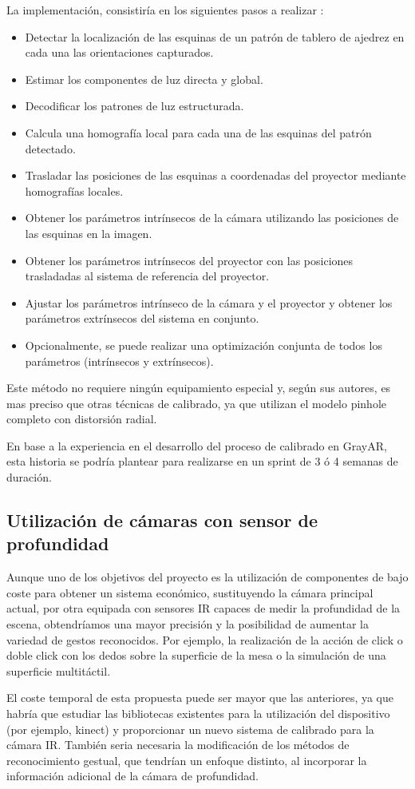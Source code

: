 La implementación, consistiría en los siguientes pasos a realizar \cite{Moreno}:
\begin{itemize}
\item Detectar la localización de las esquinas de un patrón de tablero de ajedrez en cada una las orientaciones capturados.
\item Estimar los componentes de luz directa y global.
\item Decodificar los patrones de luz estructurada.
\item Calcula una homografía local para cada una de las esquinas del patrón detectado.
\item Trasladar las posiciones de las esquinas a coordenadas del proyector mediante homografías locales.
\item Obtener los parámetros intrínsecos de la cámara utilizando las posiciones de las esquinas en la imagen.
\item Obtener los parámetros intrínsecos del proyector con las posiciones trasladadas al sistema de referencia del proyector.
\item Ajustar los parámetros intrínseco de la cámara y el proyector y obtener los parámetros extrínsecos del sistema en conjunto.
\item Opcionalmente, se puede realizar una optimización conjunta de todos los parámetros (intrínsecos y extrínsecos).
\end{itemize}

Este método no requiere ningún equipamiento especial y, según sus autores, es mas preciso que otras técnicas de calibrado, ya que utilizan el modelo pinhole completo con distorsión radial. 

En base a la experiencia en el desarrollo del proceso de calibrado en GrayAR, esta historia se podría plantear para realizarse en un sprint de 3 ó 4 semanas de duración.  

\subsection{Utilización de cámaras con sensor de profundidad} 

Aunque uno de los objetivos del proyecto es la utilización de componentes de bajo coste para obtener un sistema económico, sustituyendo la cámara principal actual, por otra equipada con sensores IR capaces de medir la profundidad de la escena, obtendríamos una mayor precisión y la posibilidad de aumentar la variedad de gestos reconocidos. Por ejemplo, la realización de la acción de click o doble click con los dedos sobre la superficie de la mesa o la simulación de una superficie multitáctil.

El coste temporal de esta propuesta puede ser mayor que las anteriores, ya que habría que estudiar las bibliotecas existentes para la utilización del dispositivo (por ejemplo, kinect) y proporcionar un nuevo sistema de calibrado para la cámara IR. También seria necesaria la modificación de los métodos de reconocimiento gestual, que tendrían un enfoque distinto, al incorporar la información adicional de la cámara de profundidad.